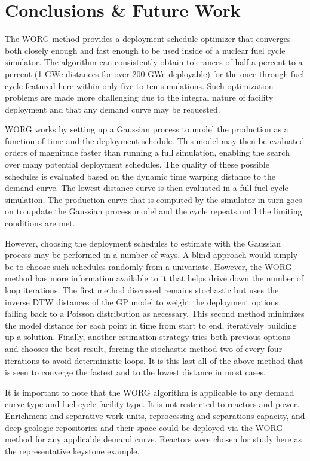 \section{Conclusions \& Future Work}
\label{conclusion}

The WORG method provides a deployment schedule optimizer that converges 
both closely enough and fast enough to be used inside
of a nuclear fuel cycle simulator. The algorithm can consistently obtain
tolerances of half-a-percent to a percent (1 GWe distances for over 200 GWe
deployable) for the once-through fuel cycle featured here within only five to 
ten simulations. Such optimization problems are made
more challenging due to the integral nature of facility deployment and
that any demand curve may be requested.

WORG works by setting up a Gaussian process to model the production
as a function of time and the deployment schedule. This model may then
be evaluated orders of magnitude faster than running a full simulation, enabling
the search over many potential deployment schedules. The quality of these
possible schedules is evaluated based on the dynamic time warping distance
to the demand curve. The lowest distance curve is then evaluated in a
full fuel cycle simulation. The production curve that is computed by the 
simulator in turn goes on to update the Gaussian process model and the
cycle repeats until the limiting conditions are met.

However, choosing the deployment schedules to estimate with the Gaussian
process may be performed in a number of ways. A blind approach would
simply be to choose such schedules randomly from a univariate. However, 
the WORG method has more information available to it that helps drive 
down the number of loop iterations. The first method discussed remains 
stochastic but uses the inverse DTW distances of the GP model to 
weight the deployment options, falling back to a Poisson distribution as 
necessary. This second method minimizes the model distance for each point 
in time from start to end, iteratively building up a solution. Finally, 
another estimation strategy tries both previous options and chooses the 
best result, forcing the stochastic method two of every four iterations 
to avoid deterministic loops.  It is this last all-of-the-above method 
that is seen to converge the fastest and to the lowest distance in most 
cases.

It is important to note that the WORG algorithm is applicable to any 
demand curve type and fuel cycle facility type. It is not restricted to 
reactors and power.  Enrichment and separative work units, reprocessing
and separations capacity, and deep geologic repositories and their
space could be deployed via the WORG method for any applicable demand 
curve.  Reactors were chosen for study here as the representative keystone 
example.

